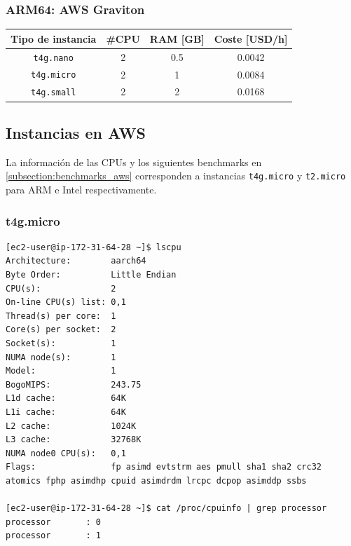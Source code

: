 \documentclass[a4paper,openright,12pt]{article}
\begin{document}
\subsubsection{ARM64: AWS Graviton}
\begin{center}
\begin{tabular}{ | c | c | c | c | }
    \hline
    Tipo de instancia       &   \#CPU   &   RAM [GB]    &   Coste [USD/h]   \\
    \hline
    \texttt{t4g.nano}       &   2       &   0.5         &   0.0042          \\
    \hline
    \texttt{t4g.micro}      &   2       &   1           &   0.0084          \\
    \hline
    \texttt{t4g.small}      &   2       &   2           &   0.0168          \\
    \hline
\end{tabular}
\end{center}

\subsection{Instancias en AWS}\label{subsection:instancias_aws}
La información de las CPUs y los siguientes benchmarks en \ref{subsection:benchmarks_aws} corresponden a instancias \texttt{t4g.micro} y \texttt{t2.micro} para ARM e Intel respectivamente.
\subsubsection{t4g.micro}
\begin{verbatim}
[ec2-user@ip-172-31-64-28 ~]$ lscpu
Architecture:        aarch64
Byte Order:          Little Endian
CPU(s):              2
On-line CPU(s) list: 0,1
Thread(s) per core:  1
Core(s) per socket:  2
Socket(s):           1
NUMA node(s):        1
Model:               1
BogoMIPS:            243.75
L1d cache:           64K
L1i cache:           64K
L2 cache:            1024K
L3 cache:            32768K
NUMA node0 CPU(s):   0,1
Flags:               fp asimd evtstrm aes pmull sha1 sha2 crc32 atomics fphp asimdhp cpuid asimdrdm lrcpc dcpop asimddp ssbs  

[ec2-user@ip-172-31-64-28 ~]$ cat /proc/cpuinfo | grep processor
processor       : 0
processor       : 1
\end{verbatim}
\end{document}
